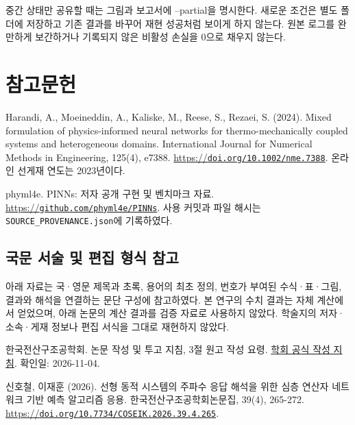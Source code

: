 \documentclass[10pt,a4paper]{article}
\begin{document}
중간 상태만 공유할 때는 그림과 보고서에 --partial을 명시한다. 새로운 조건은 별도 폴더에 저장하고 기존 결과를 바꾸어 재현 성공처럼 보이게 하지 않는다. 원본 로그를 완만하게 보간하거나 기록되지 않은 비활성 손실을 0으로 채우지 않는다.\par

\clearpage

\section{참고문헌}

{\small\color{muted} Harandi, A., Moeineddin, A., Kaliske, M., Reese, S., Rezaei, S. (2024). Mixed formulation of physics-informed neural networks for thermo-mechanically coupled systems and heterogeneous domains. International Journal for Numerical Methods in Engineering, 125(4), e7388. \href{https://doi.org/10.1002/nme.7388}{https://\nolinkurl{doi.org/10.1002/nme.7388}}. 온라인 선게재 연도는 2023년이다.\par}

{\small\color{muted} phyml4e. PINNs: 저자 공개 구현 및 벤치마크 자료. \href{https://github.com/phyml4e/PINNs}{https://\nolinkurl{github.com/phyml4e/PINNs}}. 사용 커밋과 파일 해시는 \nolinkurl{SOURCE_PROVENANCE.json}에 기록하였다.\par}

\subsection{국문 서술 및 편집 형식 참고}

{\small\color{muted} 아래 자료는 국·영문 제목과 초록, 용어의 최초 정의, 번호가 부여된 수식·표·그림, 결과와 해석을 연결하는 문단 구성에 참고하였다. 본 연구의 수치 결과는 자체 계산에서 얻었으며, 아래 논문의 계산 결과를 검증 자료로 사용하지 않았다. 학술지의 저자·소속·게재 정보나 편집 서식을 그대로 재현하지 않았다.\par}

{\small\color{muted} 한국전산구조공학회. 논문 작성 및 투고 지침, 3절 원고 작성 요령. \href{https://www.jcoseik.or.kr/journal-information/instructions-for-authors/}{학회 공식 작성 지침}. 확인일: 2026-11-04.\par}

{\small\color{muted} 신호철, 이재훈 (2026). 선형 동적 시스템의 주파수 응답 해석을 위한 심층 연산자 네트워크 기반 예측 알고리즘 응용. 한국전산구조공학회논문집, 39(4), 265-272. \href{https://doi.org/10.7734/COSEIK.2026.39.4.265}{https://\nolinkurl{doi.org/10.7734/COSEIK.2026.39.4.265}}.\par}
\end{document}
